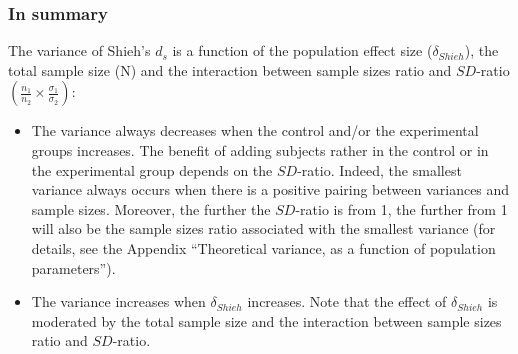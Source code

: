 \documentclass[
  man]{apa6}
\begin{document}
\hypertarget{in-summary-3}{%
\subsubsection{In summary}\label{in-summary-3}}

The variance of Shieh's \(d_s\) is a function of the population effect size (\(\delta_{Shieh}\)), the total sample size (N) and the interaction between sample sizes ratio and \(SD\)-ratio \(\left(\frac{n_1}{n_2}\times\frac{\sigma_1}{\sigma_2} \right)\):

\begin{itemize}
\item
  The variance always decreases when the control and/or the experimental groups increases. The benefit of adding subjects rather in the control or in the experimental group depends on the \(SD\)-ratio. Indeed, the smallest variance always occurs when there is a positive pairing between variances and sample sizes. Moreover, the further the \(SD\)-ratio is from 1, the further from 1 will also be the sample sizes ratio associated with the smallest variance (for details, see the Appendix \enquote{Theoretical variance, as a function of population parameters}).
\item
  The variance increases when \(\delta_{Shieh}\) increases. Note that the effect of \(\delta_{Shieh}\) is moderated by the total sample size and the interaction between sample sizes ratio and \(SD\)-ratio.
\end{itemize}
\end{document}
